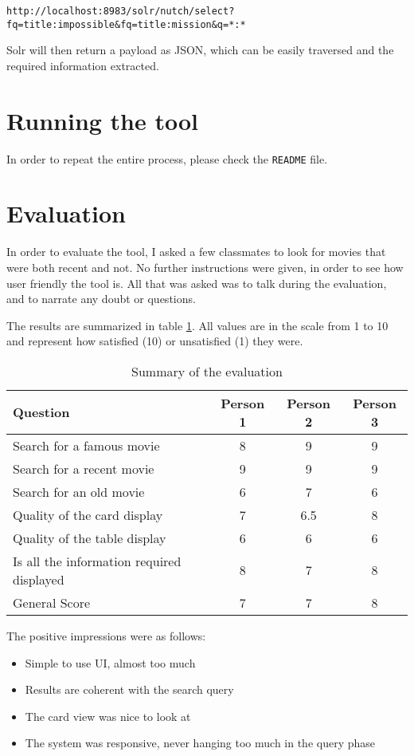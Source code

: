 \documentclass[a4paper]{article}
\begin{document}
\begin{verbatim}
http://localhost:8983/solr/nutch/select?fq=title:impossible&fq=title:mission&q=*:*	
\end{verbatim}
Solr will then return a payload as JSON, which can be easily traversed and the required information extracted. 

\section{Running the tool}
In order to repeat the entire process, please check the \texttt{README} file.

\section{Evaluation}
In order to evaluate the tool, I asked a few classmates to look for movies that were both recent and not. No further instructions were given, in order to see how user friendly the tool is. All that was asked was to talk during the evaluation, and to narrate any doubt or questions. 

The results are summarized in table \ref{tab:table1}. All values are in the scale from 1 to 10 and represent how satisfied (10) or unsatisfied (1) they were.
\begin{table}[H]
\centering
\begin{tabular}{l | c | c | c}
Question & Person 1 & Person 2 & Person 3\\\hline
Search for a famous movie & 8 & 9 & 9\\
Search for a recent movie & 9 & 9 & 9\\
Search for an old movie & 6 & 7 & 6\\
Quality of the card display & 7 & 6.5 & 8\\
Quality of the table display & 6 & 6 & 6\\
Is all the information required displayed & 8 & 7 & 8\\
General Score & 7 & 7 & 8
\end{tabular}
\label{tab:table1}
\caption{Summary of the evaluation}
\end{table}



The positive impressions were as follows:
\begin{itemize}
\item Simple to use UI, almost too much
\item Results are coherent with the search query
\item The card view was nice to look at
\item The system was responsive, never hanging too much in the query phase
\end{itemize}
\end{document}
